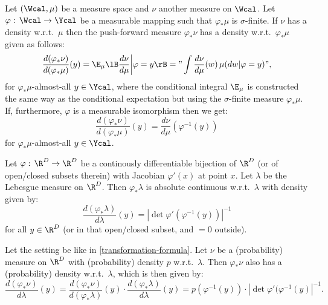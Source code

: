 \begin{Thm}
    Let $(\Wcal,\mu)$ be a  measure space and $\nu$ another measure on $\Wcal$. Let $\varphi:\,\Wcal \to \Ycal$ be a measurable mapping such that 
    $\varphi_*\mu$ is $\sigma$-finite.
    If $\nu$ has a density w.r.t.\ $\mu$ then the push-forward measure $\varphi_*\nu$ has a density w.r.t.\ $\varphi_*\mu$ given as follows:
    \[ \frac{d(\varphi_*\nu)}{d(\varphi_*\mu)}(y) = \E_\mu\lB \frac{d\nu}{d\mu} \bigg| \varphi=y\rB  = "\int \frac{d\nu}{d\mu}(w) \, \mu(dw|\varphi=y)", \]
    for $\varphi_*\mu$-almost-all $y \in \Ycal$,  where the conditional integral $\E_\mu$  is constructed 
    the same way as the conditional expectation but using the $\sigma$-finite measure $\varphi_*\mu$.\\
    If, furthermore, $\varphi$ is a measurable isomorphism then we get: 
    \[ \frac{d(\varphi_*\nu)}{d(\varphi_*\mu)}(y) = \frac{d\nu}{d\mu}(\varphi^{-1}(y)) \]
     for $\varphi_*\mu$-almost-all $y \in \Ycal$.
\end{Thm}

\begin{Thm}
    \label{transformation-formula}
    Let $\varphi:\, \R^D \to \R^D$ be a continously differentiable bijection of $\R^D$ (or of open/closed subsets therein) with Jacobian $\varphi'(x)$ at point $x$. 
    Let $\lambda$ be the Lebesgue measure on $\R^D$.
    Then $\varphi_* \lambda$ is absolute continuous w.r.t.\ $\lambda$ with density given by:
    \[ \frac{d (\varphi_*\lambda)}{d\lambda}(y) = | \det \varphi' (\varphi^{-1}(y))|^{-1}  \]
    for all $y \in \R^D$ (or in that open/closed subset, and $=0$ outside).
\end{Thm}


\begin{Cor}\label{lebesgue-density-transformation}
    Let the setting be like in \ref{transformation-formula}.
    Let $\nu$ be a (probability) measure on $\R^D$ with (probability) density $p$ w.r.t.\ $\lambda$.
    Then $\varphi_*\nu$ also has a (probability) density w.r.t.\ $\lambda$, which is then given by:
    \[ \frac{d(\varphi_*\nu)}{d\lambda}(y) = \frac{d(\varphi_*\nu)}{d(\varphi_*\lambda)}(y) \cdot \frac{d(\varphi_*\lambda)}{d\lambda}(y)  =  p(\varphi^{-1}(y)) \cdot |\det \varphi'(\varphi^{-1}(y)|^{-1}.   \]
\end{Cor}

